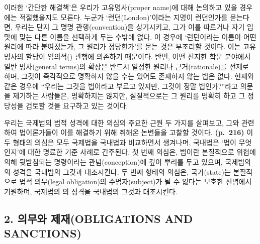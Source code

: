 이러한 `간단한 해결책'은 우리가 고유명사(proper name)에 대해 논의하고
있을 경우에는 적절했을지도 모른다. 누군가 `런던(London)'이라는 지명이
 런던인가를 묻는다면, 우리는 단지 그 명명
관행(convention)을 상기시키고, 그가 이를 따르거나 자기 입맛에 맞는 다른
이름을 선택하게 두는 수밖에 없다. 이 경우에 `런던이라는 이름이 어떤
원리에 따라 붙여졌는가, 그 원리가 정당한가'를 묻는 것은 부조리할 것이다.
이는 고유명사의 할당이  임의적() 관행에
의존하기 때문이다. 반면, 어떤 진지한 학문 분야에서 일반 명사(general
terms)의 확장은 반드시 일정한 원리나 근거(rationale)를 전제로 하며,
그것이 즉각적으로 명확하지 않을 수는 있어도 존재하지 않는 법은 없다.
현재와 같은 경우에 ``우리는 그것을 법이라고 부르고 있지만, 그것이 정말
법인가?''라고 의문을 제기하는 사람들은, 명확하지는 않지만, 실질적으로는
그 원리를 명확히 하고 그 정당성을 검토할 것을 요구하고 있는 것이다.

우리는 국제법의 법적 성격에 대한 의심의 주요한 근원 두 가지를 살펴보고,
그와 관련하여 법이론가들이 이를 해결하기 위해 취해온 논변들을 고찰할
것이다. \textbf{(p.~216)} 이 두 형태의 의심은 모두 국제법을 국내법과
비교하면서 생겨나며, 국내법은 `법이 무엇인지'에 대한 명료한 기준 사례로
간주된다. 첫 번째 의심은, 법이란 본질적으로 위협에 의해 뒷받침되는
명령이라는 관념(conception)에 깊이 뿌리를 두고 있으며, 국제법의
의 성격을 국내법의 그것과 대조시킨다. 두 번째 형태의
의심은, 국가(state)는 본질적으로 법적 의무(legal obligation)의
수범자(subject)가 될 수 없다는 모호한 신념에서 기원하며, 국제법의
의 성격을 국내법의 그것과 대조시킨다.

\subsection{2. 의무와 제재(OBLIGATIONS AND
SANCTIONS)}\label{uxc758uxbb34uxc640-uxc81cuxc7acobligations-and-sanctions}


